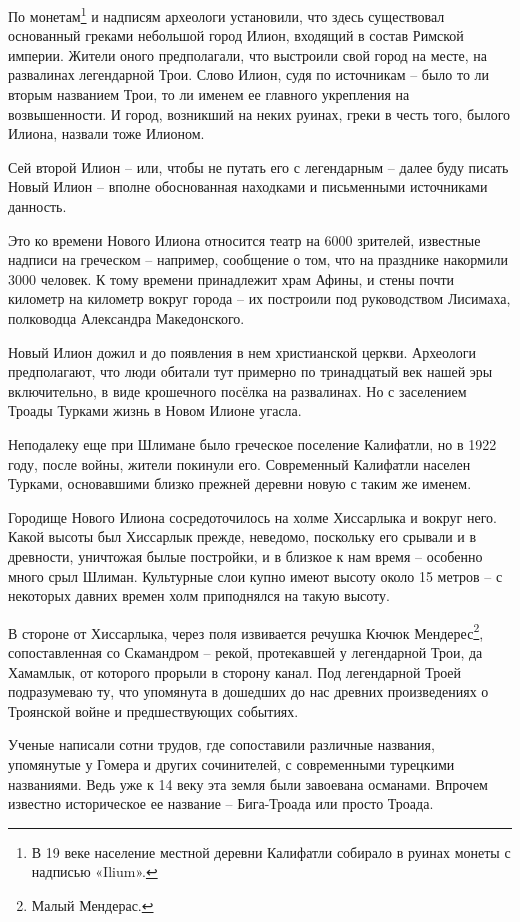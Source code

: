 По монетам\footnote{В 19 веке население местной деревни Калифатли собирало в руинах монеты с надписью «Ilium».} и надписям археологи установили, что здесь существовал основанный греками небольшой город Илион, входящий в состав Римской империи. Жители оного предполагали, что выстроили свой город на месте, на развалинах легендарной Трои. Слово Илион, судя по источникам – было то ли вторым названием Трои, то ли именем ее главного укрепления на возвышенности. И город, возникший на неких руинах, греки в честь того, былого Илиона, назвали тоже Илионом.  

Сей второй Илион – или, чтобы не путать его с легендарным – далее буду писать Новый Илион – вполне обоснованная находками и письменными источниками данность.

Это ко времени Нового Илиона относится театр на 6000 зрителей, известные надписи на греческом – например, сообщение о том, что на празднике накормили 3000 человек. К тому времени принадлежит храм Афины, и стены почти километр на километр вокруг города – их построили под руководством Лисимаха, полководца Александра Македонского. 

Новый Илион дожил и до появления в нем христианской церкви. Археологи предполагают, что люди обитали тут примерно по тринадцатый век нашей эры включительно, в виде крошечного посёлка на развалинах. Но с заселением Троады Турками жизнь в Новом Илионе угасла.

Неподалеку еще при Шлимане было греческое поселение Калифатли, но в 1922 году, после войны, жители покинули его. Современный Калифатли населен Турками, основавшими близко прежней деревни новую с таким же именем.

Городище Нового Илиона сосредоточилось на холме Хиссарлыка и вокруг него. Какой высоты был Хиссарлык прежде, неведомо, поскольку его срывали и в древности, уничтожая былые постройки, и в близкое к нам время – особенно много срыл Шлиман. Культурные слои купно имеют высоту около 15 метров – с некоторых давних времен холм приподнялся на такую высоту.

В стороне от Хиссарлыка, через поля извивается речушка Кючюк Мендерес\footnote{Малый Мендерас.}, сопоставленная со Скамандром – рекой, протекавшей у легендарной Трои, да Хамамлык, от которого прорыли в сторону канал. Под легендарной Троей подразумеваю ту, что упомянута в дошедших до нас древних произведениях о Троянской войне и предшествующих событиях.

Ученые написали сотни трудов, где сопоставили различные названия, упомянутые у Гомера и других сочинителей, с современными турецкими названиями. Ведь уже к 14 веку эта земля были завоевана османами. Впрочем известно историческое ее название – Бига-Троада или просто Троада. 

